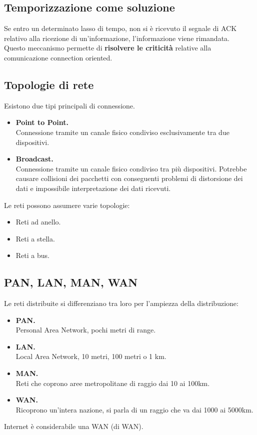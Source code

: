 \subsection{Temporizzazione come soluzione}
Se entro un determinato lasso di tempo, non si è ricevuto il segnale di ACK relativo alla ricezione di un'informazione, l'informazione viene rimandata.\\
Questo meccanismo permette di \textbf{risolvere le criticità} relative alla comunicazione connection oriented.


\subsection{Topologie di rete}
Esistono due tipi principali di connessione.
\begin{itemize}
    \item \textbf{Point to Point.}\\
    Connessione tramite un canale fisico condiviso esclusivamente tra due dispositivi.
    \item \textbf{Broadcast.}\\
    Connessione tramite un canale fisico condiviso tra più dispositivi. Potrebbe causare collisioni dei pacchetti con conseguenti problemi di distorsione dei dati e impossibile interpretazione dei dati ricevuti.
\end{itemize}

Le reti possono assumere varie topologie:
\begin{itemize}
    \item Reti ad anello.
    \item Reti a stella.
    \item Reti a bus.
\end{itemize}

\subsection{PAN, LAN, MAN, WAN}
Le reti distribuite si differenziano tra loro per l'ampiezza della distribuzione:
\begin{itemize}
    \item \textbf{PAN.}\\
    Personal Area Network, pochi metri di range.
    \item \textbf{LAN.}\\
    Local Area Network, 10 metri, 100 metri o 1 km.
    \item \textbf{MAN.}\\
    Reti che coprono aree metropolitane di raggio dai 10 ai 100km.
    \item \textbf{WAN.}\\
    Ricoprono un'intera nazione, si parla di un raggio che va dai 1000 ai 5000km.
\end{itemize}
Internet è considerabile una WAN (di WAN).

